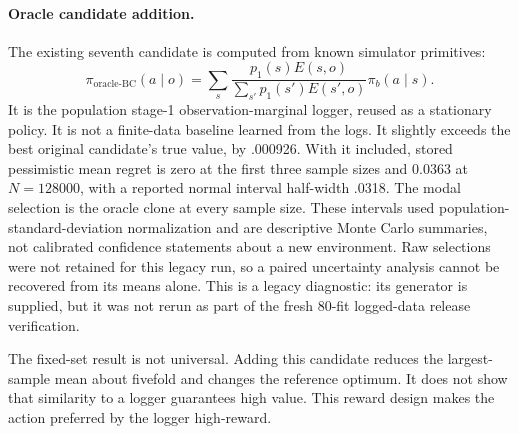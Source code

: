 \documentclass[11pt]{article}
\newcommand{\OracleBCAtLarge}{0.0363}
\begin{document}
\paragraph{Oracle candidate addition.}
The existing seventh candidate is computed from known simulator primitives:
\begin{equation}
 \pi_{\mathrm{oracle\text{-}BC}}(a\mid o)
 =\sum_s\frac{p_1(s)E(s,o)}{\sum_{s'}p_1(s')E(s',o)}\pi_b(a\mid s).
\end{equation}
It is the population stage-1 observation-marginal logger, reused as a
stationary policy. It is not a finite-data baseline learned from the logs.
It slightly exceeds the best original candidate's true value, by .000926.
With it included, stored pessimistic mean regret is zero at the first three
sample sizes and $\OracleBCAtLarge$ at $N=128000$, with a reported normal
interval half-width .0318. The modal selection is the oracle clone at every
sample size. These intervals used population-standard-deviation normalization
and are descriptive Monte Carlo summaries, not calibrated confidence statements
about a new environment. Raw selections were not retained for this legacy run,
so a paired uncertainty analysis cannot be recovered from its means alone.
This is a legacy diagnostic: its generator is supplied, but it was not rerun
as part of the fresh 80-fit logged-data release verification.

The fixed-set result is not universal. Adding this candidate reduces the
largest-sample mean about fivefold and changes the reference optimum.
It does not show that similarity to a logger guarantees high value. This
reward design makes the action preferred by the logger high-reward.
\end{document}
